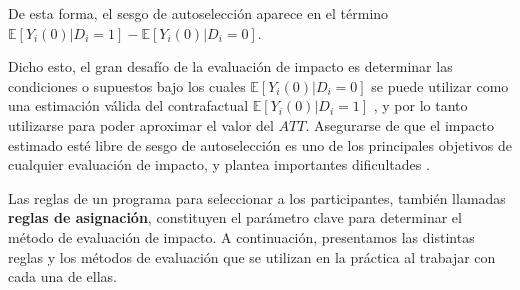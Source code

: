 \documentclass[../../main.tex]{subfiles}
\begin{document}
De esta forma, el sesgo de autoselección aparece en el término \(\mathbb{E}
\left[Y_i(0)|D_i=1\right] - \mathbb{E} \left[Y_i(0)|D_i=0\right]\).

Dicho esto, el gran desafío de la evaluación de impacto es determinar las condiciones o
supuestos bajo los cuales \(\mathbb{E} \left[Y_i(0)|D_i=0\right]\) se puede utilizar como
una estimación válida del contrafactual \(\mathbb{E} \left[Y_i(0)|D_i=1\right]\)
\cite{bernal}, y por lo tanto utilizarse para poder aproximar el valor del \(ATT\).
Asegurarse de que el impacto estimado esté libre de sesgo de autoselección es uno de los
principales objetivos de cualquier evaluación de impacto, y plantea importantes
dificultades \cite{gertler-2016}.

\bigskip
Las reglas de un programa para seleccionar a los participantes, también llamadas
\textbf{reglas de asignación}, constituyen el parámetro clave para determinar el método de
evaluación de impacto. A continuación, presentamos las distintas reglas y los métodos de
evaluación que se utilizan en la práctica al trabajar con cada una de ellas.
\end{document}

